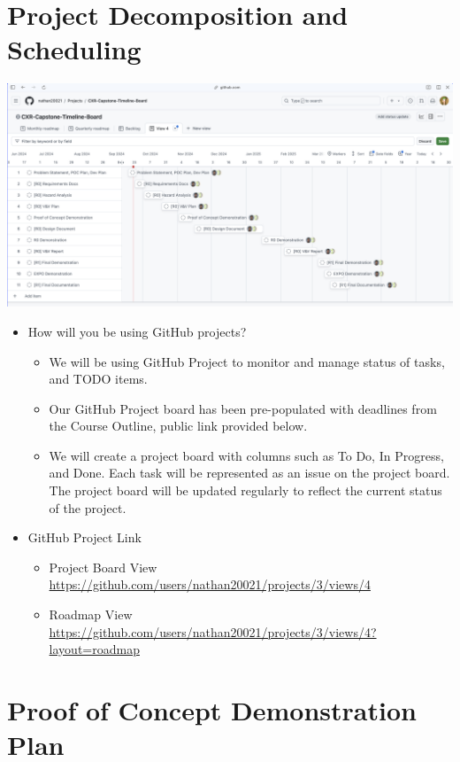 \documentclass{article}
\begin{document}
\section{Project Decomposition and Scheduling}

\includegraphics[scale=0.3]{prelim-timeline.png}
\begin{itemize}
    \item How will you be using GitHub projects? 
    \begin{itemize}
        \item We will be using GitHub Project to monitor and manage status of tasks, and TODO items.
        \item Our GitHub Project board has been pre-populated with deadlines from the Course Outline, public link provided below. 
        \item We will create a project board with columns such as To Do, In Progress, and Done. Each task will be represented as an issue on the project board. The project board will be updated regularly to reflect the current status of the project.
    \end{itemize}
    \item GitHub Project Link 
    \begin{itemize}
        \item Project Board View \url{https://github.com/users/nathan20021/projects/3/views/4}
        \item Roadmap View \url{https://github.com/users/nathan20021/projects/3/views/4?layout=roadmap}
    \end{itemize}
\end{itemize}



\section{Proof of Concept Demonstration Plan}
\end{document}
